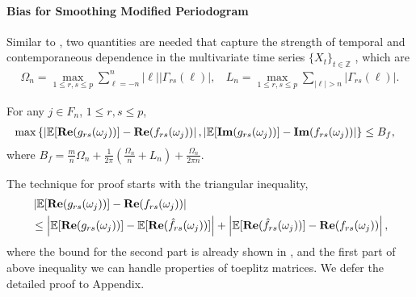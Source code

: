 \paragraph{Bias for Smoothing Modified Periodogram} Similar to \cite{sun2018large}, two quantities are needed that capture the strength of temporal and contemporaneous dependence in the multivariate time series $\{X_t\}_{t \in \mathbb{Z}}$ , which are 
\begin{eqnarray}
\Omega_{n} = \max_{1 \le r,s \le p} \sum_{\ell=-n}^n |\ell| |\Gamma_{rs}(\ell)|, ~~~~ L_n = \max_{1 \le r,s \le p}\sum_{|\ell|>n} |\Gamma_{rs}(\ell)|.
\end{eqnarray}
\begin{lem}
\label{lemma:bound_deviation}
For any $j\in F_n$, $1\le r, s\le p$, 
\begin{equation}
\begin{aligned}
&\max\left\{\left|\mathbb{E}[{\bf Re}(g_{rs}(\omega_j))] - {\bf Re}(f_{rs}(\omega_j))\right|, \left|\mathbb{E}[{\bf Im}(g_{rs}(\omega_j))] - {\bf Im}(f_{rs}(\omega_j))\right|\right\} \le B_f,
\end{aligned}
\end{equation}
where $B_f = \frac{m}{n}\Omega_n + \frac{1}{2\pi}\left(\frac{\Omega_n}{n}+L_n\right) +\frac{\Omega_n}{2\pi n}$.
\end{lem}
The technique for proof starts with the triangular inequality, 
\begin{equation}
\begin{aligned}
&\left|\mathbb{E}[{\bf Re}(g_{rs}(\omega_j))] - {\bf Re}(f_{rs}(\omega_j))\right| \\
&\le \left|\mathbb{E}[{\bf Re}(g_{rs}(\omega_j))] - \mathbb{E}[{\bf Re}(\hat{f}_{rs}(\omega_j))]\right|+\left|\mathbb{E}[{\bf Re}(\hat{f}_{rs}(\omega_j))] - {\bf Re}(f_{rs}(\omega_j))\right|, 
\end{aligned}
\end{equation}
where the bound for the second part is already shown in \cite{sun2018large}, and the first part of above inequality we can handle properties of toeplitz matrices. We defer the detailed proof to Appendix. 
